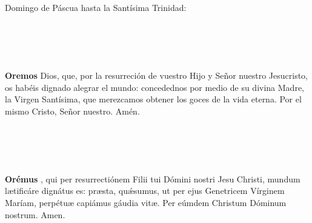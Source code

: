 \documentclass[10pt,a4paper,oneside]{book}
\begin{document}
\noindent\small{Domingo de Páscua hasta la Santísima Trinidad:}\\
\begin{minipage}[t]{0.475\textwidth}
      \\
      \\
      \\\\
      \textbf{Oremos}
       Dios, que, por la resurreción de vuestro Hijo y Señor nuestro Jesucristo,
      os habéis dignado alegrar el mundo: concedednos por medio de su divina Madre, la Virgen Santísima,
      que merezcamos obtener los goces de la vida eterna. Por el mismo Cristo, Señor nuestro. Amén.
\end{minipage}
\begin{minipage}[t]{0.475\textwidth}
      \\
      \\
      \\\\
      \textbf{Orémus}
      , qui per resurrectiónem Filii tui Dómini nostri Jesu Christi,
      mundum l{\ae}tificáre dignátus es: pr{\ae}sta, qu{\'\ae}sumus, ut per ejus Genetricem Vírginem Maríam,
      perpétu{\ae} capiámus gáudia vit{\ae}. Per eúmdem Christum Dóminum nostrum. Amen.
\end{minipage}

\bigskip
\end{document}
